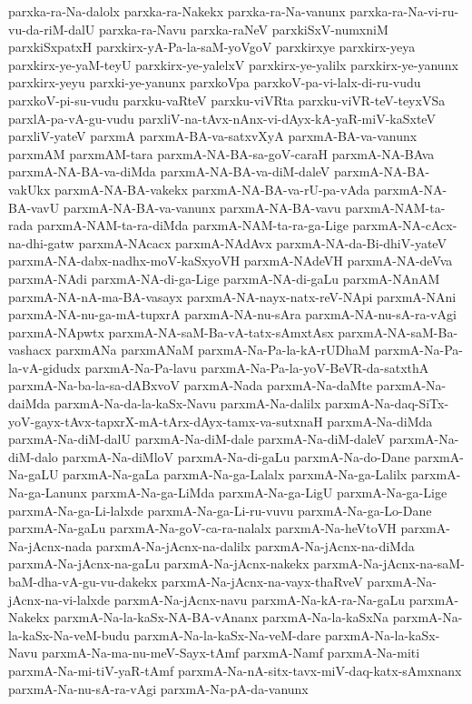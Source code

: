 {parxka-ra-Na-dalolx
parxka-ra-Nakekx
parxka-ra-Na-vanunx
parxka-ra-Na-vi-ru-vu-da-riM-dalU
parxka-ra-Navu
parxka-raNeV
parxkiSxV-numxniM
parxkiSxpatxH
parxkirx-yA-Pa-la-saM-yoVgoV
parxkirxye
parxkirx-yeya
parxkirx-ye-yaM-teyU
parxkirx-ye-yalelxV
parxkirx-ye-yalilx
parxkirx-ye-yanunx
parxkirx-yeyu
parxki-ye-yanunx
parxkoVpa
parxkoV-pa-vi-lalx-di-ru-vudu
parxkoV-pi-su-vudu
parxku-vaRteV
parxku-viVRta
parxku-viVR-teV-teyxVSa
parxlA-pa-vA-gu-vudu
parxliV-na-tAvx-nAnx-vi-dAyx-kA-yaR-miV-kaSxteV
parxliV-yateV
parxmA
parxmA-BA-va-satxvXyA
parxmA-BA-va-vanunx
parxmAM
parxmAM-tara
parxmA-NA-BA-sa-goV-caraH
parxmA-NA-BAva
parxmA-NA-BA-va-diMda
parxmA-NA-BA-va-diM-daleV
parxmA-NA-BA-vakUkx
parxmA-NA-BA-vakekx
parxmA-NA-BA-va-rU-pa-vAda
parxmA-NA-BA-vavU
parxmA-NA-BA-va-vanunx
parxmA-NA-BA-vavu
parxmA-NAM-ta-rada
parxmA-NAM-ta-ra-diMda
parxmA-NAM-ta-ra-ga-Lige
parxmA-NA-cAcx-na-dhi-gatw
parxmA-NAcacx
parxmA-NAdAvx
parxmA-NA-da-Bi-dhiV-yateV
parxmA-NA-dabx-nadhx-moV-kaSxyoVH
parxmA-NAdeVH
parxmA-NA-deVva
parxmA-NAdi
parxmA-NA-di-ga-Lige
parxmA-NA-di-gaLu
parxmA-NAnAM
parxmA-NA-nA-ma-BA-vasayx
parxmA-NA-nayx-natx-reV-NApi
parxmA-NAni
parxmA-NA-nu-ga-mA-tupxrA
parxmA-NA-nu-sAra
parxmA-NA-nu-sA-ra-vAgi
parxmA-NApwtx
parxmA-NA-saM-Ba-vA-tatx-sAmxtAsx
parxmA-NA-saM-Ba-vashacx
parxmANa
parxmANaM
parxmA-Na-Pa-la-kA-rUDhaM
parxmA-Na-Pa-la-vA-gidudx
parxmA-Na-Pa-lavu
parxmA-Na-Pa-la-yoV-BeVR-da-satxthA
parxmA-Na-ba-la-sa-dABxvoV
parxmA-Nada
parxmA-Na-daMte
parxmA-Na-daiMda
parxmA-Na-da-la-kaSx-Navu
parxmA-Na-dalilx
parxmA-Na-daq-SiTx-yoV-gayx-tAvx-tapxrX-mA-tArx-dAyx-tamx-va-sutxnaH
parxmA-Na-diMda
parxmA-Na-diM-dalU
parxmA-Na-diM-dale
parxmA-Na-diM-daleV
parxmA-Na-diM-dalo
parxmA-Na-diMloV
parxmA-Na-di-gaLu
parxmA-Na-do-Dane
parxmA-Na-gaLU
parxmA-Na-gaLa
parxmA-Na-ga-Lalalx
parxmA-Na-ga-Lalilx
parxmA-Na-ga-Lanunx
parxmA-Na-ga-LiMda
parxmA-Na-ga-LigU
parxmA-Na-ga-Lige
parxmA-Na-ga-Li-lalxde
parxmA-Na-ga-Li-ru-vuvu
parxmA-Na-ga-Lo-Dane
parxmA-Na-gaLu
parxmA-Na-goV-ca-ra-nalalx
parxmA-Na-heVtoVH
parxmA-Na-jAcnx-nada
parxmA-Na-jAcnx-na-dalilx
parxmA-Na-jAcnx-na-diMda
parxmA-Na-jAcnx-na-gaLu
parxmA-Na-jAcnx-nakekx
parxmA-Na-jAcnx-na-saM-baM-dha-vA-gu-vu-dakekx
parxmA-Na-jAcnx-na-vayx-thaRveV
parxmA-Na-jAcnx-na-vi-lalxde
parxmA-Na-jAcnx-navu
parxmA-Na-kA-ra-Na-gaLu
parxmA-Nakekx
parxmA-Na-la-kaSx-NA-BA-vAnanx
parxmA-Na-la-kaSxNa
parxmA-Na-la-kaSx-Na-veM-budu
parxmA-Na-la-kaSx-Na-veM-dare
parxmA-Na-la-kaSx-Navu
parxmA-Na-ma-nu-meV-Sayx-tAmf
parxmA-Namf
parxmA-Na-miti
parxmA-Na-mi-tiV-yaR-tAmf
parxmA-Na-nA-sitx-tavx-miV-daq-katx-sAmxnanx
parxmA-Na-nu-sA-ra-vAgi
parxmA-Na-pA-da-vanunx
}
